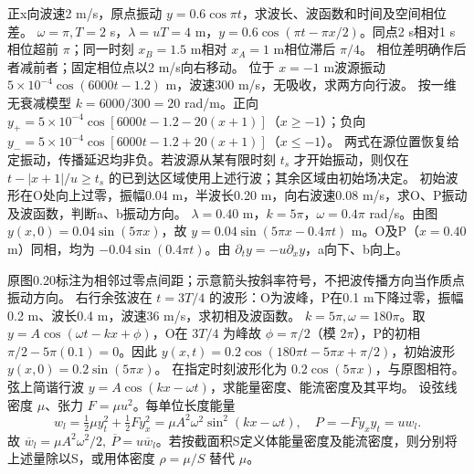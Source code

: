 \problemtext 正x向波速2 m/s，原点振动 $y=0.6\cos\pi t$，求波长、波函数和时间及空间相位差。
\workings $\omega=\pi,T=2$ s，$\lambda=uT=4$ m，$y=0.6\cos(\pi t-\pi x/2)$。同点2 s相对1 s相位超前 $\pi$；同一时刻 $x_B=1.5$ m相对 $x_A=1$ m相位滞后 $\pi/4$。
\crosscheck 相位差明确作后者减前者；固定相位点以2 m/s向右移动。
\problemtext 位于 $x=-1$ m波源振动 $5\times10^{-4}\cos(6000t-1.2)$ m，波速300 m/s，无吸收，求两方向行波。
\workings 按一维无衰减模型 $k=6000/300=20$ rad/m。正向 $y_+=5\times10^{-4}\cos[6000t-1.2-20(x+1)]$（$x\ge-1$）；负向 $y_-=5\times10^{-4}\cos[6000t-1.2+20(x+1)]$（$x\le-1$）。
\crosscheck 两式在源位置恢复给定振动，传播延迟均非负。若波源从某有限时刻 $t_s$ 才开始振动，则仅在 $t-|x+1|/u\ge t_s$ 的已到达区域使用上述行波；其余区域由初始场决定。
\problemtext 初始波形在O处向上过零，振幅0.04 m，半波长0.20 m，向右波速0.08 m/s，求O、P振动及波函数，判断a、b振动方向。
\workings $\lambda=0.40$ m，$k=5\pi$，$\omega=0.4\pi$ rad/s。由图 $y(x,0)=0.04\sin(5\pi x)$，故 $y=0.04\sin(5\pi x-0.4\pi t)$ m。O及P（$x=0.40$ m）同相，均为 $-0.04\sin(0.4\pi t)$。由 $\partial_ty=-u\partial_xy$，a向下、b向上。
\begin{center}
\end{center}
\crosscheck 原图0.20标注为相邻过零点间距；示意箭头按斜率符号，不把波传播方向当作质点振动方向。
\problemtext 右行余弦波在 $t=3T/4$ 的波形：O为波峰，P在0.1 m下降过零，振幅0.2 m、波长0.4 m，波速36 m/s，求初相及波函数。
\workings $k=5\pi,\omega=180\pi$。取 $y=A\cos(\omega t-kx+\phi)$，O在 $3T/4$ 为峰故 $\phi=\pi/2$（模 $2\pi$），P的初相 $\pi/2-5\pi(0.1)=0$。因此 $y(x,t)=0.2\cos(180\pi t-5\pi x+\pi/2)$，初始波形 $y(x,0)=0.2\sin(5\pi x)$。
\crosscheck 在指定时刻波形化为 $0.2\cos(5\pi x)$，与原图相符。
\problemtext 弦上简谐行波 $y=A\cos(kx-\omega t)$，求能量密度、能流密度及其平均。
\workings 设弦线密度 $\mu$、张力 $F=\mu u^2$。每单位长度能量
\[
w_l=\tfrac12\mu y_t^2+\tfrac12 F y_x^2=\mu A^2\omega^2\sin^2(kx-\omega t),
\quad P=-Fy_xy_t=uw_l.
\]
故 $\overline w_l=\mu A^2\omega^2/2,\ \overline P=u\overline w_l$。若按截面积S定义体能量密度及能流密度，则分别将上述量除以S，或用体密度 $\rho=\mu/S$ 替代 $\mu$。
